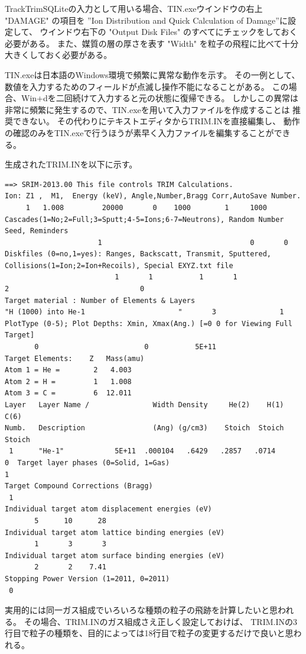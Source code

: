 \documentclass [11pt,a4paper,dvipdfmx] {jarticle}
\begin{document}
TrackTrimSQLiteの入力として用いる場合、TIN.exeウインドウの右上 "DAMAGE" の項目を
”Ion Distribution and Quick Calculation of Damage”に設定して、
ウインドウ右下の "Output Disk Files" のすべてにチェックをしておく必要がある。
また、媒質の層の厚さを表す "Width" を粒子の飛程に比べて十分大きくしておく必要がある。

TIN.exeは日本語のWindows環境で頻繁に異常な動作を示す。
その一例として、数値を入力するためのフィールドが点滅し操作不能になることがある。
この場合、Win+dを二回続けて入力すると元の状態に復帰できる。
しかしこの異常は非常に頻繁に発生するので、TIN.exeを用いて入力ファイルを作成することは
推奨できない。
その代わりにテキストエディタからTRIM.INを直接編集し、
動作の確認のみをTIN.exeで行うほうが素早く入力ファイルを編集することができる。

生成されたTRIM.INを以下に示す。

\begin{lstlisting}[caption={TRIM.INの例。},basicstyle=\fontsize{6}{6}\ttfamily,identifierstyle=\fontsize{6}{6},numberstyle={\tiny},columns=fixed]
    ==> SRIM-2013.00 This file controls TRIM Calculations.
Ion: Z1 ,  M1,  Energy (keV), Angle,Number,Bragg Corr,AutoSave Number.
     1   1.008         20000       0    1000        1     1000
Cascades(1=No;2=Full;3=Sputt;4-5=Ions;6-7=Neutrons), Random Number Seed, Reminders
                      1                                   0       0
Diskfiles (0=no,1=yes): Ranges, Backscatt, Transmit, Sputtered, Collisions(1=Ion;2=Ion+Recoils), Special EXYZ.txt file
                          1       1           1       1               2                               0
Target material : Number of Elements & Layers
"H (1000) into He-1                      "       3               1
PlotType (0-5); Plot Depths: Xmin, Xmax(Ang.) [=0 0 for Viewing Full Target]
       0                         0           5E+11
Target Elements:    Z   Mass(amu)
Atom 1 = He =        2   4.003
Atom 2 = H =         1   1.008
Atom 3 = C =         6  12.011
Layer   Layer Name /               Width Density     He(2)    H(1)    C(6)
Numb.   Description                (Ang) (g/cm3)    Stoich  Stoich  Stoich
 1      "He-1"            5E+11  .000104   .6429   .2857   .0714
0  Target layer phases (0=Solid, 1=Gas)
1 
Target Compound Corrections (Bragg)
 1  
Individual target atom displacement energies (eV)
       5      10      28
Individual target atom lattice binding energies (eV)
       1       3       3
Individual target atom surface binding energies (eV)
       2       2    7.41
Stopping Power Version (1=2011, 0=2011)
 0 
\end{lstlisting}
実用的には同一ガス組成でいろいろな種類の粒子の飛跡を計算したいと思われる。
その場合、TRIM.INのガス組成さえ正しく設定しておけば、
TRIM.INの3行目で粒子の種類を、目的によっては18行目で粒子の変更するだけで良いと思われる。
\end{document}

